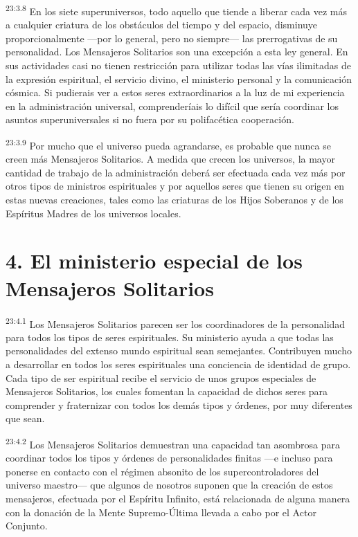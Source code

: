 \par
\textsuperscript{23:3.8} En los siete superuniversos, todo aquello que tiende a liberar cada vez más a cualquier criatura de los obstáculos del tiempo y del espacio, disminuye proporcionalmente ---por lo general, pero no siempre--- las prerrogativas de su personalidad. Los Mensajeros Solitarios son una excepción a esta ley general. En sus actividades casi no tienen restricción para utilizar todas las vías ilimitadas de la expresión espiritual, el servicio divino, el ministerio personal y la comunicación cósmica. Si pudierais ver a estos seres extraordinarios a la luz de mi experiencia en la administración universal, comprenderíais lo difícil que sería coordinar los asuntos superuniversales si no fuera por su polifacética cooperación.

\par
\textsuperscript{23:3.9} Por mucho que el universo pueda agrandarse, es probable que nunca se creen más Mensajeros Solitarios. A medida que crecen los universos, la mayor cantidad de trabajo de la administración deberá ser efectuada cada vez más por otros tipos de ministros espirituales y por aquellos seres que tienen su origen en estas nuevas creaciones, tales como las criaturas de los Hijos Soberanos y de los Espíritus Madres de los universos locales.

\section*{4. El ministerio especial de los Mensajeros Solitarios}
\par
\textsuperscript{23:4.1} Los Mensajeros Solitarios parecen ser los coordinadores de la personalidad para todos los tipos de seres espirituales. Su ministerio ayuda a que todas las personalidades del extenso mundo espiritual sean semejantes. Contribuyen mucho a desarrollar en todos los seres espirituales una conciencia de identidad de grupo. Cada tipo de ser espiritual recibe el servicio de unos grupos especiales de Mensajeros Solitarios, los cuales fomentan la capacidad de dichos seres para comprender y fraternizar con todos los demás tipos y órdenes, por muy diferentes que sean.

\par
\textsuperscript{23:4.2} Los Mensajeros Solitarios demuestran una capacidad tan asombrosa para coordinar todos los tipos y órdenes de personalidades finitas ---e incluso para ponerse en contacto con el régimen absonito de los supercontroladores del universo maestro--- que algunos de nosotros suponen que la creación de estos mensajeros, efectuada por el Espíritu Infinito, está relacionada de alguna manera con la donación de la Mente Supremo-Última llevada a cabo por el Actor Conjunto.

